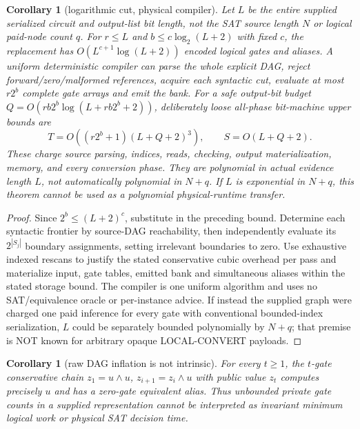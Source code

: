 \documentclass[11pt]{article}
\newtheorem{corollary}[theorem]{Corollary}
\begin{document}
\begin{corollary}[logarithmic cut, physical compiler]
Let $L$ be the entire \emph{supplied serialized circuit and output-list bit length}, not the SAT source length $N$ or logical paid-node count $q$. For $r\le L$ and $b\le c\log_2(L+2)$ with fixed $c$, the replacement has $O(L^{c+1}\log(L+2))$ encoded logical gates and aliases. A uniform deterministic compiler can parse the whole explicit DAG, reject forward/zero/malformed references, acquire each syntactic cut, evaluate at most $r2^b$ complete gate arrays and emit the bank. For a safe output-bit budget $Q=O(rb2^b\log(L+rb2^b+2))$, deliberately loose all-phase bit-machine upper bounds are
$$
T=O((r2^b+1)(L+Q+2)^3),\qquad S=O(L+Q+2).
$$
These charge source parsing, indices, reads, checking, output materialization, memory, and every conversion phase. They are polynomial in \emph{actual evidence length} $L$, not automatically polynomial in $N+q$. If $L$ is exponential in $N+q$, this theorem cannot be used as a polynomial physical-runtime transfer.
\end{corollary}
\begin{proof}
Since $2^b\le(L+2)^c$, substitute in the preceding bound. Determine each syntactic frontier by source-DAG reachability, then independently evaluate its $2^{|S_j|}$ boundary assignments, setting irrelevant boundaries to zero. Use exhaustive indexed rescans to justify the stated conservative cubic overhead per pass and materialize input, gate tables, emitted bank and simultaneous aliases within the stated storage bound. The compiler is one uniform algorithm and uses no SAT/equivalence oracle or per-instance advice. If instead the supplied graph were charged one paid inference for every gate with conventional bounded-index serialization, $L$ could be separately bounded polynomially by $N+q$; that premise is NOT known for arbitrary opaque LOCAL-CONVERT payloads.
\end{proof}

\begin{corollary}[raw DAG inflation is not intrinsic]
For every $t\ge1$, the $t$-gate conservative chain $z_1=u\land u$, $z_{i+1}=z_i\land u$ with public value $z_t$ computes precisely $u$ and has a zero-gate equivalent alias. Thus unbounded private gate counts in a supplied representation cannot be interpreted as invariant minimum logical work or physical SAT decision time.
\end{corollary}
\end{document}
